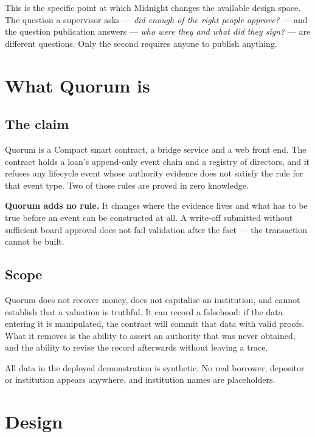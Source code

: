 \documentclass[11pt,a4paper]{article}
\begin{document}
This is the specific point at which Midnight changes the available design space. The question a
supervisor asks --- \emph{did enough of the right people approve?} --- and the question publication
answers --- \emph{who were they and what did they sign?} --- are different questions. Only the second
requires anyone to publish anything.

\section{What Quorum is}

\subsection{The claim}

Quorum is a Compact smart contract, a bridge service and a web front end. The contract holds a loan's
append-only event chain and a registry of directors, and it refuses any lifecycle event whose authority
evidence does not satisfy the rule for that event type. Two of those rules are proved in zero knowledge.

\textbf{Quorum adds no rule.} It changes where the evidence lives and what has to be true before an event
can be constructed at all. A write-off submitted without sufficient board approval does not fail
validation after the fact --- the transaction cannot be built.

\subsection{Scope}

Quorum does not recover money, does not capitalise an institution, and cannot establish that a valuation
is truthful. It can record a falsehood: if the data entering it is manipulated, the contract will commit
that data with valid proofs. What it removes is the ability to assert an authority that was never
obtained, and the ability to revise the record afterwards without leaving a trace.

All data in the deployed demonstration is synthetic. No real borrower, depositor or institution appears
anywhere, and institution names are placeholders.

\section{Design}
\end{document}
